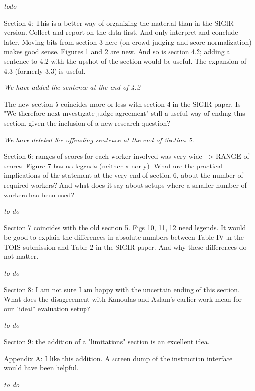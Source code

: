 \documentclass{article}
\newcommand{\comment}[1]{\vspace{1em} \emph{#1} \vspace{1em}}
\begin{document}
\comment {todo}

Section 4: This is a better way of organizing the material than in
the SIGIR version. Collect and report on the data first. And only
interpret and conclude later. Moving bits from section 3 here (on
crowd judging and score normalization) makes good sense. Figures 1
and 2 are new. And so is section 4.2; adding a sentence to 4.2 with
the upshot of the section would be useful. The expansion of 4.3
(formerly 3.3) is useful.

\comment {We have added the sentence at the end of 4.2}

The new section 5 coincides more  or less with section 4 in the
SIGIR paper. Is "We therefore next investigate judge agreement"
still a useful  way of ending this section, given the inclusion of
a new research question?

\comment {We have deleted the offending sentence at the end of Section 5.}

Section 6:  ranges of scores for each worker involved was very wide
--> RANGE of scores. Figure 7 has no legends (neither x nor y).
What are the practical implications of the statement at the very
end of section 6, about the number of required workers? And what
does it say about setups where a smaller number of workers has been
used?

\comment {to do}

Section 7 coincides with the old section 5. Figs 10, 11, 12 need
legends. It would be good to explain the differences in absolute
numbers between Table IV in the TOIS submission and Table 2 in the
SIGIR paper. And why these differences do not matter.

\comment {to do}

Section 8: I am not sure I am happy with the uncertain ending of
this section. What does the disagreement with Kanoulas and Aslam's
earlier work mean for our "ideal" evaluation setup?

\comment {to do}

Section 9: the addition of a "limitations" section is an excellent
idea.

Appendix A: I like this addition. A screen dump of the instruction
interface would have been helpful.

\comment {to do}
\end{document}
